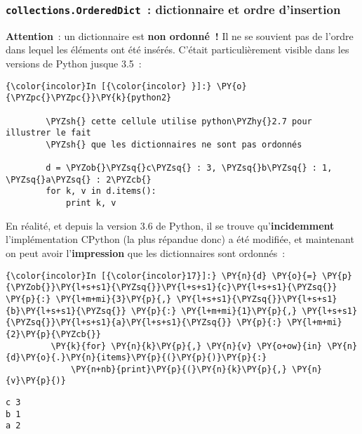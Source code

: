     \hypertarget{collections.ordereddict-dictionnaire-et-ordre-dinsertion}{%
\subsubsection{\texorpdfstring{\texttt{collections.OrderedDict}~:
dictionnaire et ordre
d'insertion}{collections.OrderedDict~: dictionnaire et ordre d'insertion}}\label{collections.ordereddict-dictionnaire-et-ordre-dinsertion}}

    \textbf{Attention}~: un dictionnaire est \textbf{non ordonné~!} Il ne se
souvient pas de l'ordre dans lequel les éléments ont été insérés.
C'était particulièrement visible dans les versions de Python jusque
3.5~:

    \begin{Verbatim}[commandchars=\\\{\}]
{\color{incolor}In [{\color{incolor} }]:} \PY{o}{\PYZpc{}\PYZpc{}}\PY{k}{python2}
        
        \PYZsh{} cette cellule utilise python\PYZhy{}2.7 pour illustrer le fait
        \PYZsh{} que les dictionnaires ne sont pas ordonnés
        
        d = \PYZob{}\PYZsq{}c\PYZsq{} : 3, \PYZsq{}b\PYZsq{} : 1, \PYZsq{}a\PYZsq{} : 2\PYZcb{}
        for k, v in d.items():
            print k, v
\end{Verbatim}


    En réalité, et depuis la version 3.6 de Python, il se trouve
qu'\textbf{incidemment} l'implémentation CPython (la plus répandue donc)
a été modifiée, et maintenant on peut avoir l'\textbf{impression} que
les dictionnaires sont ordonnés~:

    \begin{Verbatim}[commandchars=\\\{\}]
{\color{incolor}In [{\color{incolor}17}]:} \PY{n}{d} \PY{o}{=} \PY{p}{\PYZob{}}\PY{l+s+s1}{\PYZsq{}}\PY{l+s+s1}{c}\PY{l+s+s1}{\PYZsq{}} \PY{p}{:} \PY{l+m+mi}{3}\PY{p}{,} \PY{l+s+s1}{\PYZsq{}}\PY{l+s+s1}{b}\PY{l+s+s1}{\PYZsq{}} \PY{p}{:} \PY{l+m+mi}{1}\PY{p}{,} \PY{l+s+s1}{\PYZsq{}}\PY{l+s+s1}{a}\PY{l+s+s1}{\PYZsq{}} \PY{p}{:} \PY{l+m+mi}{2}\PY{p}{\PYZcb{}}
         \PY{k}{for} \PY{n}{k}\PY{p}{,} \PY{n}{v} \PY{o+ow}{in} \PY{n}{d}\PY{o}{.}\PY{n}{items}\PY{p}{(}\PY{p}{)}\PY{p}{:}
             \PY{n+nb}{print}\PY{p}{(}\PY{n}{k}\PY{p}{,} \PY{n}{v}\PY{p}{)}
\end{Verbatim}


    \begin{Verbatim}[commandchars=\\\{\}]
c 3
b 1
a 2

    \end{Verbatim}

